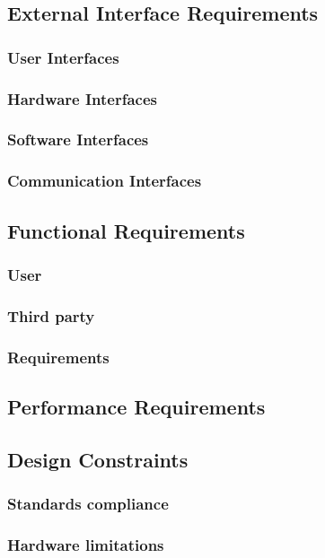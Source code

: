 \subsection{External Interface Requirements}
\subsubsection{User Interfaces}
\subsubsection{Hardware Interfaces}
\subsubsection{Software Interfaces}
\subsubsection{Communication Interfaces}


\subsection{Functional  Requirements}
\subsubsection{User}
\subsubsection{Third party}
\subsubsection{Requirements}

\subsection{Performance Requirements}


\subsection{Design Constraints}
\subsubsection{Standards compliance}
\subsubsection{Hardware limitations}
